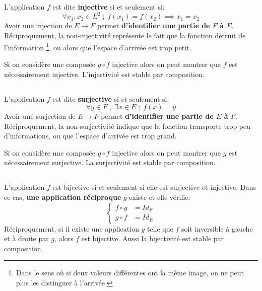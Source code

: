 \subsection*{}

L'application \(f\) est dite \textbf{injective} si et seulement si:
\[
    \forall x_1, x_2 \in E^2 \; ; \; f(x_1) = f(x_2) \implies x_1 = x_2 
\]
Avoir une injection de \( E \longrightarrow F \) permet \textbf{d'identifier une partie de \( F \) à \( E \)}. Réciproquement, la non-injectivité représente le fait que la fonction détruit de l'information \footnote[1]{Dans le sens où si deux valeurs différentes ont la même image, on ne peut plus les distinguer à l'arrivée.}, ou alors que l'espace d'arrivée est trop petit.\<

Si on considère une composée \(g \circ f\) injective alors on peut montrer que \(f\) est nécessairement injective. L'injectivité est stable par composition.
\subsection*{}

L'application \(f\) est dite \textbf{surjective} si et seulement si:
\[ 
    \forall y \in F \; , \; \exists x \in E \; ; \; f(x) = y
\]
Avoir une surjection de \( E \longrightarrow F \) permet \textbf{d'identifier une partie de \( E \) à \( F \)}. Réciproquement, la non-surjectivité indique que la fonction transporte trop peu d'informations, ou que l'espace d'arrivée est trop grand.\<

Si on considère une composée \(g \circ f\) injective alors on peut montrer que \(g\) est nécessairement surjective. La surjectivité est stable par composition.
\subsection*{}

L'application \(f\) est bijective si et seulement si elle est surjective et injective. Dans ce cas, \textbf{une application réciproque} \(g\) existe et elle vérifie:
\[
    \begin{cases}
        f \circ g &= Id_F \\
        g \circ f &= Id_E
    \end{cases}
\]
Réciproquement, si il existe une application \(g\) telle que \(f\) soit inversible à gauche et à droite par \(g\), alors \(f\) est bijective. Aussi la bijectivité est stable par composition.
